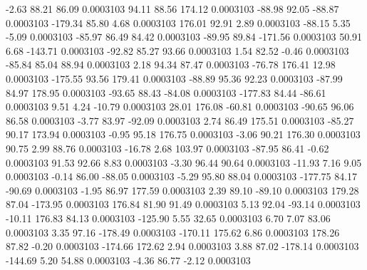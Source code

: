        -2.63       88.21       86.09     0.0003103
       94.11       88.56      174.12     0.0003103
      -88.98       92.05      -88.87     0.0003103
     -179.34       85.80        4.68     0.0003103
      176.01       92.91        2.89     0.0003103
      -88.15        5.35       -5.09     0.0003103
      -85.97       86.49       84.42     0.0003103
      -89.95       89.84     -171.56     0.0003103
       50.91        6.68     -143.71     0.0003103
      -92.82       85.27       93.66     0.0003103
        1.54       82.52       -0.46     0.0003103
      -85.84       85.04       88.94     0.0003103
        2.18       94.34       87.47     0.0003103
      -76.78      176.41       12.98     0.0003103
     -175.55       93.56      179.41     0.0003103
      -88.89       95.36       92.23     0.0003103
      -87.99       84.97      178.95     0.0003103
      -93.65       88.43      -84.08     0.0003103
     -177.83       84.44      -86.61     0.0003103
        9.51        4.24      -10.79     0.0003103
       28.01      176.08      -60.81     0.0003103
      -90.65       96.06       86.58     0.0003103
       -3.77       83.97      -92.09     0.0003103
        2.74       86.49      175.51     0.0003103
      -85.27       90.17      173.94     0.0003103
       -0.95       95.18      176.75     0.0003103
       -3.06       90.21      176.30     0.0003103
       90.75        2.99       88.76     0.0003103
      -16.78        2.68      103.97     0.0003103
      -87.95       86.41       -0.62     0.0003103
       91.53       92.66        8.83     0.0003103
       -3.30       96.44       90.64     0.0003103
      -11.93        7.16        9.05     0.0003103
       -0.14       86.00      -88.05     0.0003103
       -5.29       95.80       88.04     0.0003103
     -177.75       84.17      -90.69     0.0003103
       -1.95       86.97      177.59     0.0003103
        2.39       89.10      -89.10     0.0003103
      179.28       87.04     -173.95     0.0003103
      176.84       81.90       91.49     0.0003103
        5.13       92.04      -93.14     0.0003103
      -10.11      176.83       84.13     0.0003103
     -125.90        5.55       32.65     0.0003103
        6.70        7.07       83.06     0.0003103
        3.35       97.16     -178.49     0.0003103
     -170.11      175.62        6.86     0.0003103
      178.26       87.82       -0.20     0.0003103
     -174.66      172.62        2.94     0.0003103
        3.88       87.02     -178.14     0.0003103
     -144.69        5.20       54.88     0.0003103
       -4.36       86.77       -2.12     0.0003103
